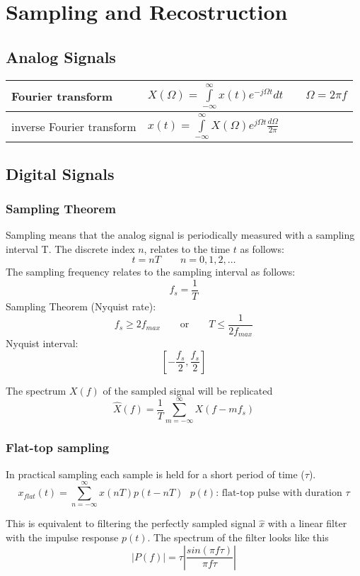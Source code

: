 \section{Sampling and Recostruction}
\subsection{Analog Signals}
\begin{tabularx}{\linewidth}{|l|X|}
	\hline
	Fourier transform & $X(\Omega) = \int\limits_{-\infty}^{\infty} x(t)e^{-j\Omega t}dt \qquad \Omega = 2\pi f $ \\
	\hline
	inverse Fourier transform & $ x(t) = \int\limits_{-\infty}^{\infty} X(\Omega)e^{j\Omega t} \frac{d\Omega}{2 \pi} $ \\
	\hline
\end{tabularx}

\subsection{Digital Signals}
\subsubsection{Sampling Theorem}
Sampling means that the analog signal is periodically measured with a sampling interval T. The discrete index $n$, relates to
the time $t$ as follows:
\[ t = nT \qquad n = 0,1,2,\ldots \]
The sampling frequency relates to the sampling interval as follows:
\[ f_s = \frac{1}{T} \]
Sampling Theorem (Nyquist rate):
\[ f_s \geq 2f_{max} \qquad \text{or} \qquad T \leq \frac{1}{2f_{max}} \]
Nyquist interval:
\[ \left[-\frac{f_s}{2}, \frac{f_s}{2}\right] \]

The spectrum $X(f)$ of the sampled signal will be replicated
\[ \hat{X}(f) = \frac{1}{T} \sum_{m=-\infty}^{\infty}X(f-m f_s)\]


\subsubsection{Flat-top sampling}
In practical sampling each sample is held for a short period of time ($\tau$).
\[ x_{flat}(t) =  \sum_{n=-\infty}^{\infty}x(nT)p(t - nT) ~~~ p(t) \text{: flat-top pulse with duration } \tau \]

This is equivalent to filtering the perfectly sampled signal $\hat{x}$ with a linear filter with the impulse response $p(t)$.
The spectrum of the filter looks like this
\[ |P(f)| = \tau \left| \frac{sin(\pi f \tau)}{\pi f \tau} \right| \]

